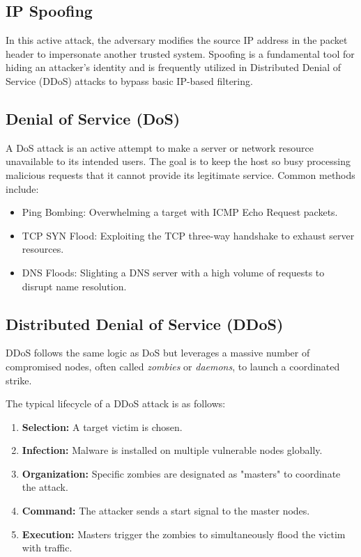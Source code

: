 \subsection{IP Spoofing}
In this active attack, the adversary modifies the source IP address in the packet header to impersonate another trusted system. Spoofing is a fundamental tool for hiding an attacker's identity and is frequently utilized in Distributed Denial of Service (DDoS) attacks to bypass basic IP-based filtering.

\subsection{Denial of Service (DoS)}
A DoS attack is an active attempt to make a server or network resource unavailable to its intended users. The goal is to keep the host so busy processing malicious requests that it cannot provide its legitimate service. Common methods include:
\begin{itemize}
    \item Ping Bombing: Overwhelming a target with ICMP Echo Request packets.
    \item TCP SYN Flood: Exploiting the TCP three-way handshake to exhaust server resources.
    \item DNS Floods: Slighting a DNS server with a high volume of requests to disrupt name resolution.
\end{itemize}

\subsection{Distributed Denial of Service (DDoS)}
DDoS follows the same logic as DoS but leverages a massive number of compromised nodes, often called \textit{zombies} or \textit{daemons}, to launch a coordinated strike.

The typical lifecycle of a DDoS attack is as follows:
\begin{enumerate}
    \item \textbf{Selection:} A target victim is chosen.
    \item \textbf{Infection:} Malware is installed on multiple vulnerable nodes globally.
    \item \textbf{Organization:} Specific zombies are designated as "masters" to coordinate the attack.
    \item \textbf{Command:} The attacker sends a start signal to the master nodes.
    \item \textbf{Execution:} Masters trigger the zombies to simultaneously flood the victim with traffic.
\end{enumerate}

